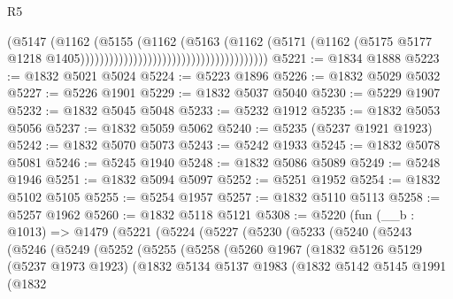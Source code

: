\begin{lexlean}{R5}
\begin{coremodule}
                                                                (@5147
                                                                  (@1162
                                                                    (@5155
                                                                      (@1162
                                                                        (@5163
                                                                          (@1162
                                                                            (@5171
                                                                              (@1162
                                                                                (@5175
                                                                                  @5177
                                                                                  @1218
                                                                                  @1405)))))))))))))))))))))))))))))))))))))))
@5221 := @1834 @1888
@5223 := @1832 @5021 @5024
@5224 := @5223 @1896
@5226 := @1832 @5029 @5032
@5227 := @5226 @1901
@5229 := @1832 @5037 @5040
@5230 := @5229 @1907
@5232 := @1832 @5045 @5048
@5233 := @5232 @1912
@5235 := @1832 @5053 @5056
@5237 := @1832 @5059 @5062
@5240 := @5235 (@5237 @1921 @1923)
@5242 := @1832 @5070 @5073
@5243 := @5242 @1933
@5245 := @1832 @5078 @5081
@5246 := @5245 @1940
@5248 := @1832 @5086 @5089
@5249 := @5248 @1946
@5251 := @1832 @5094 @5097
@5252 := @5251 @1952
@5254 := @1832 @5102 @5105
@5255 := @5254 @1957
@5257 := @1832 @5110 @5113
@5258 := @5257 @1962
@5260 := @1832 @5118 @5121
@5308 := @5220
    (fun (__b : @1013) =>
    @1479
      (@5221
        (@5224
          (@5227
            (@5230
              (@5233
                (@5240
                  (@5243
                    (@5246
                      (@5249
                        (@5252
                          (@5255
                            (@5258
                              (@5260
                                @1967
                                (@1832
                                  @5126
                                  @5129
                                  (@5237 @1973 @1923)
                                  (@1832
                                    @5134
                                    @5137
                                    @1983
                                    (@1832
                                      @5142
                                      @5145
                                      @1991
                                      (@1832

\end{coremodule}
\end{lexlean}
